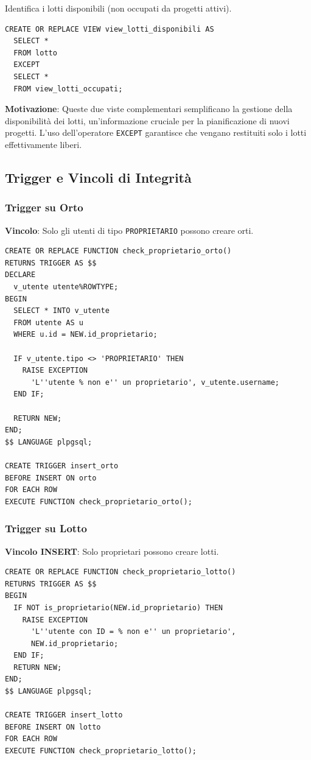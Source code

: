 \documentclass[12pt,a4paper]{article}
\begin{document}
Identifica i lotti disponibili (non occupati da progetti attivi).

\begin{lstlisting}[style=sqlstyle]
CREATE OR REPLACE VIEW view_lotti_disponibili AS
  SELECT * 
  FROM lotto 
  EXCEPT 
  SELECT * 
  FROM view_lotti_occupati;
\end{lstlisting}

\textbf{Motivazione}: Queste due viste complementari semplificano la gestione della disponibilità dei lotti, un'informazione cruciale per la pianificazione di nuovi progetti. L'uso dell'operatore \texttt{EXCEPT} garantisce che vengano restituiti solo i lotti effettivamente liberi.

\subsection{Trigger e Vincoli di Integrità}

\subsubsection{Trigger su Orto}

\textbf{Vincolo}: Solo gli utenti di tipo \texttt{PROPRIETARIO} possono creare orti.

\begin{lstlisting}[style=sqlstyle]
CREATE OR REPLACE FUNCTION check_proprietario_orto()
RETURNS TRIGGER AS $$
DECLARE 
  v_utente utente%ROWTYPE;
BEGIN
  SELECT * INTO v_utente
  FROM utente AS u 
  WHERE u.id = NEW.id_proprietario;

  IF v_utente.tipo <> 'PROPRIETARIO' THEN 
    RAISE EXCEPTION 
      'L''utente % non e'' un proprietario', v_utente.username;
  END IF;

  RETURN NEW;
END;
$$ LANGUAGE plpgsql;

CREATE TRIGGER insert_orto
BEFORE INSERT ON orto
FOR EACH ROW
EXECUTE FUNCTION check_proprietario_orto();
\end{lstlisting}

\subsubsection{Trigger su Lotto}

\textbf{Vincolo INSERT}: Solo proprietari possono creare lotti.

\begin{lstlisting}[style=sqlstyle]
CREATE OR REPLACE FUNCTION check_proprietario_lotto()
RETURNS TRIGGER AS $$ 
BEGIN
  IF NOT is_proprietario(NEW.id_proprietario) THEN
    RAISE EXCEPTION 
      'L''utente con ID = % non e'' un proprietario', 
      NEW.id_proprietario;
  END IF;
  RETURN NEW;
END;
$$ LANGUAGE plpgsql;

CREATE TRIGGER insert_lotto 
BEFORE INSERT ON lotto
FOR EACH ROW 
EXECUTE FUNCTION check_proprietario_lotto();
\end{lstlisting}
\end{document}
